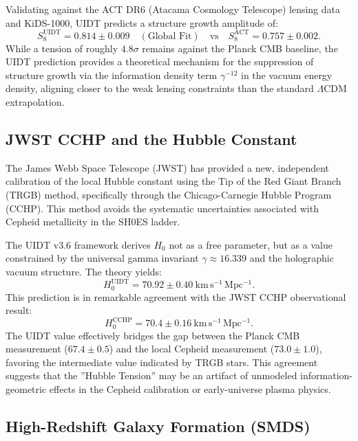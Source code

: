 Validating against the ACT DR6 (Atacama Cosmology Telescope) lensing data and KiDS-1000, UIDT predicts a structure growth amplitude of:
\begin{equation}
\label{eq:s8_prediction}
S_8^{\mathrm{UIDT}} = 0.814 \pm 0.009 \quad (\text{Global Fit}) \quad \text{vs} \quad S_8^{\mathrm{ACT}} = 0.757 \pm 0.002.
\end{equation}
While a tension of roughly $4.8\sigma$ remains against the Planck CMB baseline, the UIDT prediction provides a theoretical mechanism for the suppression of structure growth via the information density term $\gamma^{-12}$ in the vacuum energy density, aligning closer to the weak lensing constraints than the standard $\Lambda$CDM extrapolation.

\subsection{JWST CCHP and the Hubble Constant}
\label{subsec:jwst_results}

The James Webb Space Telescope (JWST) has provided a new, independent calibration of the local Hubble constant using the Tip of the Red Giant Branch (TRGB) method, specifically through the Chicago-Carnegie Hubble Program (CCHP). This method avoids the systematic uncertainties associated with Cepheid metallicity in the SH0ES ladder.

The UIDT v3.6 framework derives $H_0$ not as a free parameter, but as a value constrained by the universal gamma invariant $\gamma \approx 16.339$ and the holographic vacuum structure. The theory yields:
\begin{equation}
\label{eq:h0_prediction}
H_0^{\mathrm{UIDT}} = 70.92 \pm 0.40~\mathrm{km\,s^{-1}\,Mpc^{-1}}.
\end{equation}
This prediction is in remarkable agreement with the JWST CCHP observational result:
\begin{equation}
\label{eq:h0_jwst}
H_0^{\mathrm{CCHP}} = 70.4 \pm 0.16~\mathrm{km\,s^{-1}\,Mpc^{-1}}.
\end{equation}
The UIDT value effectively bridges the gap between the Planck CMB measurement ($67.4 \pm 0.5$) and the local Cepheid measurement ($73.0 \pm 1.0$), favoring the intermediate value indicated by TRGB stars. This agreement suggests that the ''Hubble Tension'' may be an artifact of unmodeled information-geometric effects in the Cepheid calibration or early-universe plasma physics.

\subsection{High-Redshift Galaxy Formation (SMDS)}
\label{subsec:smds}

